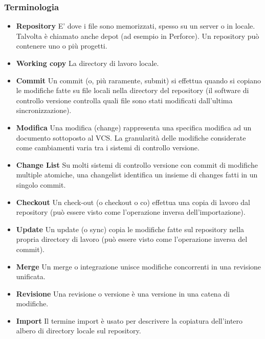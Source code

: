 \subsubsection{Terminologia}
\begin{itemize}
\item \textbf{Repository} E' dove i file sono memorizzati, spesso su un server o in locale. Talvolta è chiamato anche depot (ad esempio in Perforce). Un repository può contenere uno o più progetti.

\item \textbf{Working copy} La directory di lavoro locale.

\item \textbf{Commit}
Un commit (o, più raramente, submit) si effettua quando si copiano le modifiche fatte su file locali nella directory del repository (il software di controllo versione controlla quali file sono stati modificati dall'ultima sincronizzazione).

\item \textbf{Modifica}
Una modifica (change) rappresenta una specifica modifica ad un documento sottoposto al VCS. La granularità delle modifiche considerate come cambiamenti varia tra i sistemi di controllo versione.

\item \textbf{Change List}
Su molti sistemi di controllo versione con commit di modifiche multiple atomiche, una changelist identifica un insieme di changes fatti in un singolo commit.

\item \textbf{Checkout}
Un check-out (o checkout o co) effettua una copia di lavoro dal repository (può essere visto come l'operazione inversa dell'importazione).

\item \textbf{Update}
Un update (o sync) copia le modifiche fatte sul repository nella propria directory di lavoro (può essere visto come l'operazione inversa del commit).

\item \textbf{Merge}
Un merge o integrazione unisce modifiche concorrenti in una revisione unificata.

\item \textbf{Revisione}
Una revisione o versione è una versione in una catena di modifiche.

\item \textbf{Import}
Il termine import è usato per descrivere la copiatura dell'intero albero di directory locale sul repository.


\end{itemize}
